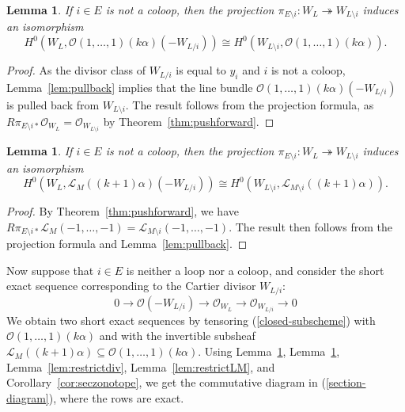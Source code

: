 \documentclass{amsart}
\newtheorem{lemma}[theorem]{Lemma}
\theoremstyle{definition}
\begin{document}
\begin{lemma} \label{O-deletion} If $i \in E$ is not a coloop, then the projection $\pi_{E\setminus i} \colon W_{L} 
        \twoheadrightarrow W_{L\setminus i}$ induces an isomorphism 
        \[
            H^0(W_L, \mathcal{O}(1, \ldots, 
            1)(k\alpha)(-W_{L/i}))
                \cong H^0(W_{L\setminus i}, \mathcal{O}(1, \ldots, 1)(k\alpha)).
        \]
\end{lemma}
\begin{proof}
As the divisor class of $W_{L/i}$ is equal to $y_i$ and $i$ is not a coloop, Lemma~\ref{lem:pullback} implies that the line bundle $\mathcal{O}(1, \ldots, 1)(k\alpha)(-W_{L/i})$ is pulled back from $W_{L \setminus i}$. The result follows from the projection formula, as $R\pi_{E \setminus i*} \mathcal{O}_{W_L} = \mathcal{O}_{W_{L \setminus i}}$ by Theorem~\ref{thm:pushforward}. 
\end{proof}

\begin{lemma} \label{L-deletion} If $i \in E$ is not a coloop, then the projection $\pi_{E \setminus i} \colon W_{L} 
        \twoheadrightarrow W_{L\setminus i}$ induces an isomorphism 
        \[
            H^0(W_L, \mathcal{L}_M((k+1)\alpha)(-W_{L/i}))
            \cong H^0(W_{L\setminus i}, \mathcal{L}_{M\setminus i}((k+1)\alpha)).
        \]
\end{lemma}
\begin{proof}
By Theorem~\ref{thm:pushforward}, we have $R\pi_{E \setminus i *} \mathcal{L}_M(-1, \dotsc, -1) = \mathcal{L}_{M \setminus i}(-1, \dotsc, -1)$. The result then follows from the projection formula and Lemma~\ref{lem:pullback}. 
\end{proof}

Now suppose that $i \in E$ is neither a loop nor a coloop, and consider the short exact sequence corresponding to the Cartier divisor $W_{L/i}$: 
\begin{equation} \label{closed-subscheme}
    0 \to \mathcal{O}(-W_{L/i}) \to \mathcal{O}_{W_L} \to 
    \mathcal{O}_{W_{L/i}} \to 0
\end{equation}
We obtain two short exact sequences by tensoring (\ref{closed-subscheme}) with $\mathcal{O}(1, \ldots, 
1)(k\alpha)$ and with the invertible 
subsheaf $\mathcal{L}_M((k+1)\alpha) \subseteq \mathcal{O}(1, 
\ldots, 1)(k\alpha)$. Using Lemma~\ref{O-deletion}, 
Lemma~\ref{L-deletion}, Lemma~\ref{lem:restrictdiv}, Lemma~\ref{lem:restrictLM}, and 
Corollary~\ref{cor:seczonotope}, we get the commutative 
diagram in (\ref{section-diagram}), where the rows are exact.
\end{document}
